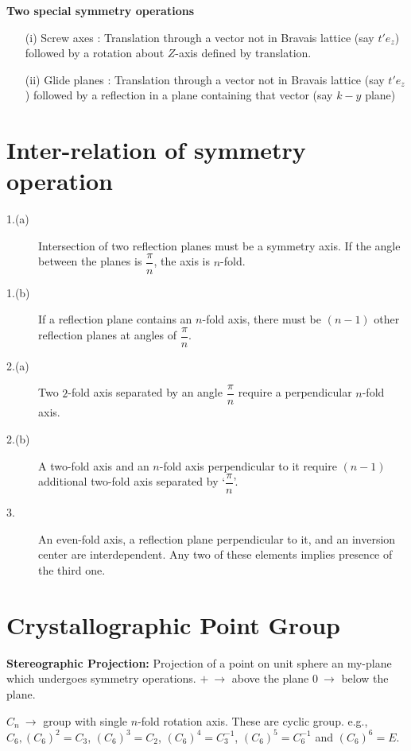 \noindent
{\bf Two special symmetry operations}
\begin{itemize}
\item[(i)] Screw axes : Translation through a vector not in Bravais lattice (say $t'e_{z}$) followed by a rotation about $Z$-axis defined by translation.

\item[(ii)] Glide planes : Translation through a vector not in Bravais lattice (say $t'e_{z}$) followed by a reflection in a plane containing that vector (say $k-y$ plane)
\end{itemize}

\section*{Inter-relation of symmetry operation}
\begin{description}
\item[1.(a)] Intersection of two reflection planes must be a symmetry axis. If the angle between the planes is $\dfrac{\pi}{n}$, the axis is $n$-fold.

\item[1.(b)] If a reflection plane contains an $n$-fold axis, there must be $(n-1)$ other reflection planes at angles of $\dfrac{\pi}{n}$.

\item[2.(a)] Two $2$-fold axis separated by an angle $\dfrac{\pi}{n}$ require a perpendicular $n$-fold axis.

\item[2.(b)] A two-fold axis and an $n$-fold axis perpendicular to it require $(n-1)$ additional two-fold axis separated by `$\dfrac{\pi}{n}$'.

\item[3.] An even-fold axis, a reflection plane perpendicular to it, and an inversion center are interdependent. Any two of these elements implies presence of the third one.
\end{description}

\section*{Crystallographic Point Group}

\noindent
{\bf Stereographic Projection:} Projection of a point on unit sphere an my-plane which undergoes symmetry operations. $+ \ \to$ above the plane $0 \ \to$ below the plane.

$C_{n} \ \to$ group with single $n$-fold rotation axis. These are cyclic group. e.g., $C_{6},(C_{6})^{2}=C_{3}$, $(C_{6})^{3}=C_{2}$, $(C_{6})^{4}=C^{-1}_{3}$, $(C_{6})^{5}=C^{-1}_{6}$ and $(C_{6})^{6}=E$.

